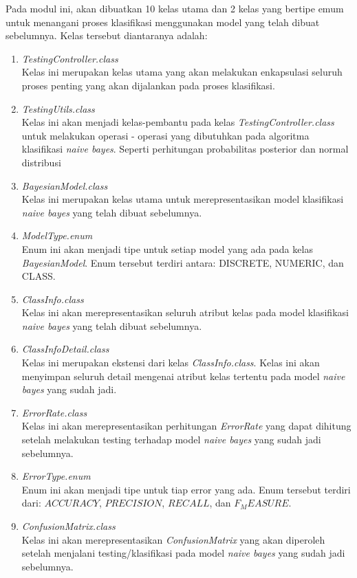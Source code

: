 Pada modul ini, akan dibuatkan 10 kelas utama dan 2 kelas yang bertipe emum untuk menangani proses klasifikasi menggunakan model yang telah dibuat sebelumnya. Kelas tersebut diantaranya adalah: 
\begin{enumerate}
\item{\textit{TestingController.class}} \\
Kelas ini merupakan kelas utama yang akan melakukan enkapsulasi seluruh proses penting yang akan dijalankan pada proses klasifikasi.
\item{\textit{TestingUtils.class}} \\
Kelas ini akan menjadi kelas-pembantu pada kelas \textit{TestingController.class} untuk melakukan operasi - operasi yang dibutuhkan pada algoritma klasifikasi \textit{naive bayes}. Seperti perhitungan probabilitas posterior dan normal distribusi
\item{\textit{BayesianModel.class}} \\
Kelas ini merupakan kelas utama untuk merepresentasikan model klasifikasi \textit{naive bayes} yang telah dibuat sebelumnya.
\item{\textit{ModelType.enum}} \\
Enum ini akan menjadi tipe untuk setiap model yang ada pada kelas \textit{BayesianModel}. Enum tersebut terdiri antara: DISCRETE, NUMERIC, dan CLASS.
\item{\textit{ClassInfo.class}} \\
Kelas ini akan merepresentasikan seluruh atribut kelas pada model klasifikasi \textit{naive bayes} yang telah dibuat sebelumnya.
\item{\textit{ClassInfoDetail.class}} \\
Kelas ini merupakan ekstensi dari kelas \textit{ClassInfo.class}. Kelas ini akan menyimpan seluruh detail mengenai atribut kelas tertentu pada model \textit{naive bayes} yang sudah jadi.
\item{\textit{ErrorRate.class}} \\
Kelas ini akan merepresentasikan perhitungan \textit{ErrorRate} yang dapat dihitung setelah melakukan testing terhadap model \textit{naive bayes} yang sudah jadi sebelumnya.
\item{\textit{ErrorType.enum}} \\
Enum ini akan menjadi tipe untuk tiap error yang ada. Enum tersebut terdiri dari: $ACCURACY$, $PRECISION$, $RECALL$, dan $F_MEASURE$.
\item{\textit{ConfusionMatrix.class}} \\
Kelas ini akan merepresentasikan \textit{ConfusionMatrix} yang akan diperoleh setelah menjalani testing/klasifikasi pada model \textit{naive bayes} yang sudah jadi sebelumnya.

\end{enumerate}
